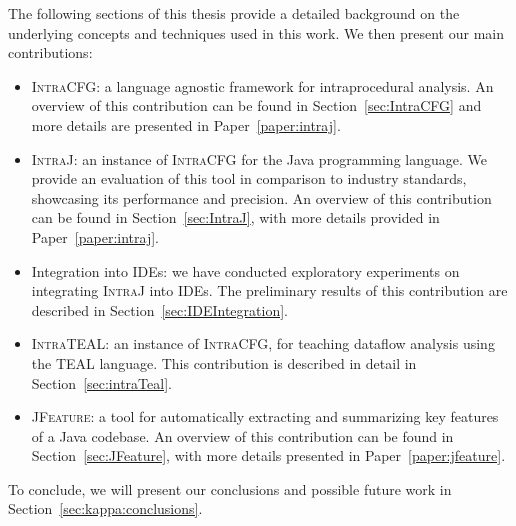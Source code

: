 The following sections of this thesis provide a detailed background on the 
underlying concepts and techniques used in this work. We then present our main contributions:
\begin{itemize}
	\item \textsc{IntraCFG}: a language agnostic framework for intraprocedural analysis.
	 An overview of this contribution can be found in Section~\ref{sec:IntraCFG} and more details are presented in Paper~\ref{paper:intraj}.
	\item \textsc{IntraJ}: an instance of \textsc{IntraCFG} for the Java programming language. 
	We provide an evaluation of this tool in comparison to industry standards, showcasing its 
	performance and precision. An overview of this contribution can be found in Section~\ref{sec:IntraJ},
	with more details provided in Paper~\ref{paper:intraj}.
	\item Integration into IDEs: we have conducted exploratory experiments on integrating
	\textsc{IntraJ} into IDEs. The preliminary results of this contribution are described in Section~\ref{sec:IDEIntegration}.
	\item \textsc{IntraTEAL}: an instance of \textsc{IntraCFG}, for teaching dataflow analysis using the TEAL language.
	This contribution is described in detail in Section~\ref{sec:intraTeal}.
	\item \textsc{JFeature}: a tool for automatically extracting and summarizing key 
	features of a Java codebase. An overview of this contribution can be found 
	in Section~\ref{sec:JFeature}, with more details presented in Paper~\ref{paper:jfeature}.

\end{itemize}

To conclude, we will present our conclusions and possible future work in Section~\ref{sec:kappa:conclusions}.


